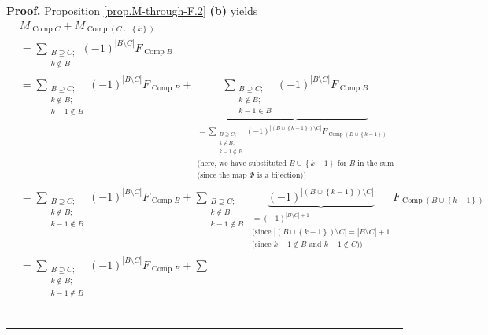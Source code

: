 \documentclass[numbers=enddot,12pt,final,onecolumn,notitlepage]{scrartcl}%
\theoremstyle{definition}
\newenvironment{proof}[1][Proof]{\noindent\textbf{#1.} }{\ \rule{0.5em}{0.5em}}
\let\sumnonlimits\sum
\renewcommand{\sum}{\sumnonlimits\limits}
\begin{document}
\begin{proof}
Proposition \ref{prop.M-through-F.2} \textbf{(b)} yields
\begin{align*}
&  M_{\operatorname*{Comp}C}+M_{\operatorname*{Comp}\left(  C\cup\left\{
k\right\}  \right)  }\\
&  =\sum_{\substack{B\supseteq C;\\k\notin B}}\left(  -1\right)  ^{\left\vert
B\setminus C\right\vert }F_{\operatorname*{Comp}B}\\
&  =\sum_{\substack{B\supseteq C;\\k\notin B;\\k-1\notin B}}\left(  -1\right)
^{\left\vert B\setminus C\right\vert }F_{\operatorname*{Comp}B}%
+\underbrace{\sum_{\substack{B\supseteq C;\\k\notin B;\\k-1\in B}}\left(
-1\right)  ^{\left\vert B\setminus C\right\vert }F_{\operatorname*{Comp}B}%
}_{\substack{=\sum_{\substack{B\supseteq C;\\k\notin B;\\k-1\notin B}}\left(
-1\right)  ^{\left\vert \left(  B\cup\left\{  k-1\right\}  \right)  \setminus
C\right\vert }F_{\operatorname*{Comp}\left(  B\cup\left\{  k-1\right\}
\right)  }\\\text{(here, we have substituted }B\cup\left\{  k-1\right\}
\text{ for }B\text{ in the sum}\\\text{(since the map }\Phi\text{ is a
bijection))}}}\\
&  =\sum_{\substack{B\supseteq C;\\k\notin B;\\k-1\notin B}}\left(  -1\right)
^{\left\vert B\setminus C\right\vert }F_{\operatorname*{Comp}B}+\sum
_{\substack{B\supseteq C;\\k\notin B;\\k-1\notin B}}\underbrace{\left(
-1\right)  ^{\left\vert \left(  B\cup\left\{  k-1\right\}  \right)  \setminus
C\right\vert }}_{\substack{=\left(  -1\right)  ^{\left\vert B\setminus
C\right\vert +1}\\\text{(since }\left\vert \left(  B\cup\left\{  k-1\right\}
\right)  \setminus C\right\vert =\left\vert B\setminus C\right\vert
+1\\\text{(since }k-1\notin B\text{ and }k-1\notin C\text{))}}%
}F_{\operatorname*{Comp}\left(  B\cup\left\{  k-1\right\}  \right)  }\\
&  =\sum_{\substack{B\supseteq C;\\k\notin B;\\k-1\notin B}}\left(  -1\right)
^{\left\vert B\setminus C\right\vert }F_{\operatorname*{Comp}B}+\sum

\end{align*}
\end{proof}
\end{document}
